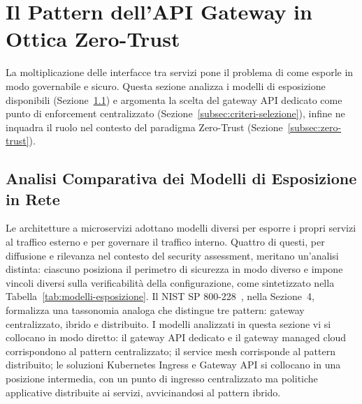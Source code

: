 \section{Il Pattern dell'API Gateway in Ottica Zero-Trust}\label{sec:gateway}

La moltiplicazione delle interfacce tra servizi pone il problema di come esporle in modo governabile e sicuro. Questa sezione analizza i modelli di esposizione disponibili (Sezione~\ref{subsec:modelli-esposizione}) e argomenta la scelta del gateway \gls{API} dedicato come punto di enforcement centralizzato (Sezione~\ref{subsec:criteri-selezione}), infine ne inquadra il ruolo nel contesto del paradigma Zero-Trust (Sezione~\ref{subsec:zero-trust}).

\subsection{Analisi Comparativa dei Modelli di Esposizione in Rete}\label{subsec:modelli-esposizione}

Le architetture a microservizi adottano modelli diversi per esporre i propri servizi al traffico esterno e per governare il traffico interno. Quattro di questi, per diffusione e rilevanza nel contesto del security assessment, meritano un'analisi distinta: ciascuno posiziona il perimetro di sicurezza in modo diverso e impone vincoli diversi sulla verificabilità della configurazione, come sintetizzato nella Tabella~\ref{tab:modelli-esposizione}.
Il \gls{NIST} SP 800-228~\cite{chandramouliGuidelinesAPIProtection2026}, nella Sezione~4, formalizza una tassonomia analoga che distingue tre pattern: gateway centralizzato, ibrido e distribuito. I modelli analizzati in questa sezione vi si collocano in modo diretto: il gateway API dedicato e il gateway managed cloud corrispondono al pattern centralizzato; il service mesh corrisponde al pattern distribuito; le soluzioni Kubernetes Ingress e Gateway API si collocano in una posizione intermedia, con un punto di ingresso centralizzato ma politiche applicative distribuite ai servizi, avvicinandosi al pattern ibrido.



